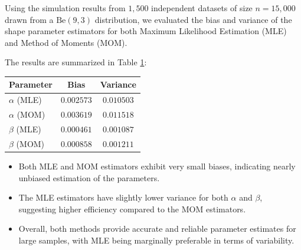 Using the simulation results from $1,\!500$ independent datasets of size \(n = 15,\!000\) drawn from a \(\text{Be}(9, 3)\) distribution, we evaluated the bias and variance of the shape parameter estimators for both Maximum Likelihood Estimation (MLE) and Method of Moments (MOM).

The results are summarized in Table \ref{tab:q11b}:

\begin{table}[H]
\centering
\footnotesize
{}
\label{tab:q11b}
\begin{tabular}{lcc}
\hline
\textbf{Parameter} & \textbf{Bias} & \textbf{Variance} \\
\hline
\(\alpha\) (MLE) & \(0.002573\) & \(0.010503\) \\
\(\alpha\) (MOM) & \(0.003619\) & \(0.011518\) \\
\hline
\(\beta\) (MLE) & \(0.000461\) & \(0.001087\) \\
\(\beta\) (MOM) & \(0.000858\) & \(0.001211\) \\
\hline
\end{tabular}
\end{table}

\begin{itemize}
    \item Both MLE and MOM estimators exhibit very small biases, indicating nearly unbiased estimation of the parameters.
    \item The MLE estimators have slightly lower variance for both \(\alpha\) and \(\beta\), suggesting higher efficiency compared to the MOM estimators.
    \item Overall, both methods provide accurate and reliable parameter estimates for large samples, with MLE being marginally preferable in terms of variability.
\end{itemize}







